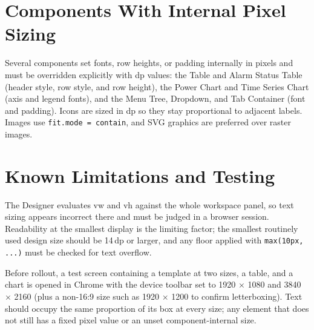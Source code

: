 \section{Components With Internal Pixel Sizing}
Several components set fonts, row heights, or padding internally in pixels and must be overridden explicitly with dp values: the Table and Alarm Status Table (header style, row style, and row height), the Power Chart and Time Series Chart (axis and legend fonts), and the Menu Tree, Dropdown, and Tab Container (font and padding). Icons are sized in dp so they stay proportional to adjacent labels. Images use \texttt{fit.\allowbreak{}mode = contain}, and SVG graphics are preferred over raster images.

\section{Known Limitations and Testing}
The Designer evaluates vw and vh against the whole workspace panel, so text sizing appears incorrect there and must be judged in a browser session. Readability at the smallest display is the limiting factor; the smallest routinely used design size should be 14\,dp or larger, and any floor applied with \texttt{max(10px, ...)} must be checked for text overflow.

Before rollout, a test screen containing a template at two sizes, a table, and a chart is opened in Chrome with the device toolbar set to 1920 $\times$ 1080 and 3840 $\times$ 2160 (plus a non-16:9 size such as 1920 $\times$ 1200 to confirm letterboxing). Text should occupy the same proportion of its box at every size; any element that does not still has a fixed pixel value or an unset component-internal size.
